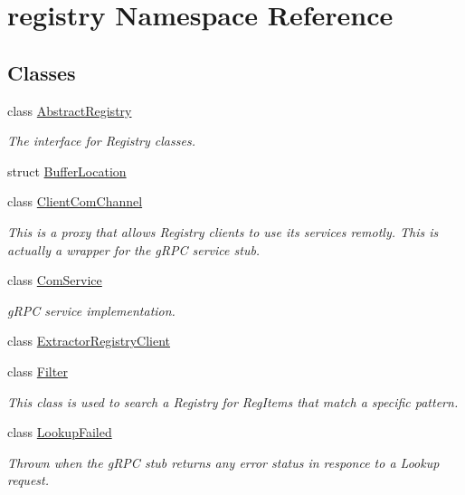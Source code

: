 \hypertarget{namespaceregistry}{}\section{registry Namespace Reference}
\label{namespaceregistry}
\subsection*{Classes}
\begin{DoxyCompactItemize}
\item 
class \hyperlink{classregistry_1_1AbstractRegistry}{Abstract\+Registry}
\begin{DoxyCompactList}\small\item\em The interface for Registry classes. \end{DoxyCompactList}\item 
struct \hyperlink{structregistry_1_1BufferLocation}{Buffer\+Location}
\item 
class \hyperlink{classregistry_1_1ClientComChannel}{Client\+Com\+Channel}
\begin{DoxyCompactList}\small\item\em This is a proxy that allows Registry clients to use its services remotly. This is actually a wrapper for the g\+R\+PC service stub. \end{DoxyCompactList}\item 
class \hyperlink{classregistry_1_1ComService}{Com\+Service}
\begin{DoxyCompactList}\small\item\em g\+R\+PC service implementation. \end{DoxyCompactList}\item 
class \hyperlink{classregistry_1_1ExtractorRegistryClient}{Extractor\+Registry\+Client}
\item 
class \hyperlink{classregistry_1_1Filter}{Filter}
\begin{DoxyCompactList}\small\item\em This class is used to search a Registry for Reg\+Items that match a specific pattern. \end{DoxyCompactList}\item 
class \hyperlink{classregistry_1_1LookupFailed}{Lookup\+Failed}
\begin{DoxyCompactList}\small\item\em Thrown when the g\+R\+PC stub returns any error status in responce to a Lookup request. \end{DoxyCompactList}\item 

\end{DoxyCompactItemize}
